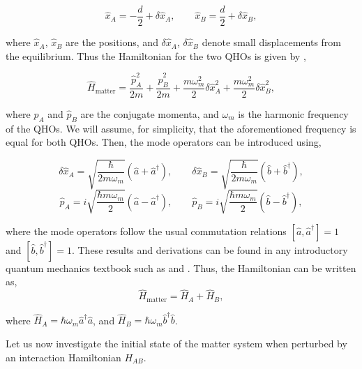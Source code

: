 \documentclass[12pt,a4paper]{report}
\theoremstyle{plain}
\theoremstyle{definition}
\theoremstyle{remark}
\renewcommand{\dag}{\dagger}
\begin{document}
\begin{equation}
    \hat{x}_{A}=-\frac{d}{2}+\delta\hat{x}_{A},\qquad \hat{x}_{B}=\frac{d}{2}+\delta\hat{x}_{B},
    \label{eq: Oscillator Locations}
\end{equation}

where $\hat{x}_{A}$, $\hat{x}_{B}$ are the positions, and $\delta\hat{x}_{A}$, $\delta\hat{x}_{B}$ denote small displacements from the equilibrium. Thus the Hamiltonian for the two QHOs is given by \cite{Bose_2022,griffiths_schroeter_2018,Tannoudji_2019},

\begin{equation}
    \hat{H}_{\text{matter}} =  \frac{\hat{p}_A^2}{2m} + \frac{\hat{p}_B^2}{2m} + \frac{m\omega_m^2}{2}\delta\hat{x}^2_{A} + \frac{m\omega_m^2}{2}\delta\hat{x}^2_{B},
\end{equation}

where $\hat{p}_A$ and $\hat{p}_B$ are the conjugate momenta, and $\omega_m$ is the harmonic frequency of the QHOs. We will assume, for simplicity, that the aforementioned frequency is equal for both QHOs. Then, the mode operators can be introduced using,

\begin{equation} \label{eq: ModeOp1}
    \delta\hat{x}_{A} = \sqrt{\frac{\hbar}{2m\omega_m}}(\hat{a} + \hat{a}^{\dag}), \qquad \delta\hat{x}_{B} = \sqrt{\frac{\hbar}{2m\omega_m}}(\hat{b} + \hat{b}^{\dag}),
\end{equation}
\begin{equation} \label{eq: ModeOp2}
    \hat{p}_A = i\sqrt{\frac{\hbar m\omega_m}{2}}(\hat{a} - \hat{a}^{\dag}), \qquad \hat{p}_B = i\sqrt{\frac{\hbar m\omega_m}{2}}(\hat{b} - \hat{b}^{\dag}),
\end{equation}

where the mode operators follow the usual commutation relations $[\hat{a}, \hat{a}^{\dag}] = 1$ and $[\hat{b}, \hat{b}^{\dag}] = 1$. These results and derivations can be found in any introductory quantum mechanics textbook such as \citet{griffiths_schroeter_2018} and \citet{Tannoudji_2019}. Thus, the Hamiltonian can be written as,
\begin{equation}
    \hat{H}_{\text{matter}} = \hat{H}_A + \hat{H}_B,
\end{equation}

where $\hat{H}_A = \hbar\omega_m \hat{a}^{\dag}\hat{a}$, and $\hat{H}_B = \hbar\omega_m \hat{b}^{\dag}\hat{b}$.

Let us now investigate the initial state of the matter system when perturbed by an interaction Hamiltonian $H_{AB}$.
\end{document}
